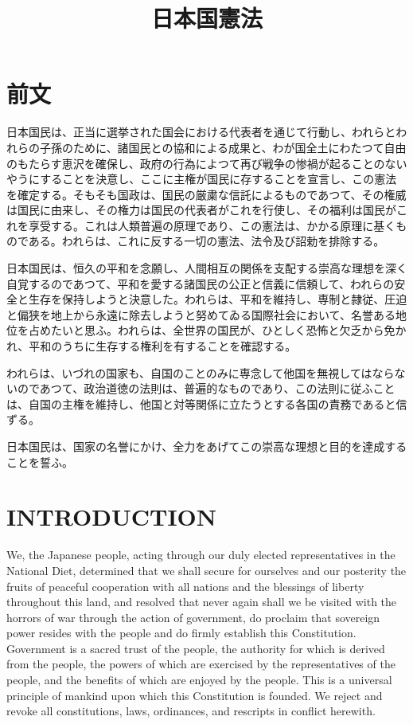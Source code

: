 \documentclass[twocolumn]{jsarticle}
\begin{document}
\title{日本国憲法}
\author{}
\date{}
\maketitle

\section*{前文}

日本国民は、正当に選挙された国会における代表者を通じて行動し、われらとわれらの子孫のために、諸国民との協和による成果と、わが国全土にわたつて自由のもたらす恵沢を確保し、政府の行為によつて再び戦争の惨禍が起ることのないやうにすることを決意し、ここに主権が国民に存することを宣言し、この憲法を確定する。そもそも国政は、国民の厳粛な信託によるものであつて、その権威は国民に由来し、その権力は国民の代表者がこれを行使し、その福利は国民がこれを享受する。これは人類普遍の原理であり、この憲法は、かかる原理に基くものである。われらは、これに反する一切の憲法、法令及び詔勅を排除する。

日本国民は、恒久の平和を念願し、人間相互の関係を支配する崇高な理想を深く自覚するのであつて、平和を愛する諸国民の公正と信義に信頼して、われらの安全と生存を保持しようと決意した。われらは、平和を維持し、専制と隷従、圧迫と偏狭を地上から永遠に除去しようと努めてゐる国際社会において、名誉ある地位を占めたいと思ふ。われらは、全世界の国民が、ひとしく恐怖と欠乏から免かれ、平和のうちに生存する権利を有することを確認する。

われらは、いづれの国家も、自国のことのみに専念して他国を無視してはならないのであつて、政治道徳の法則は、普遍的なものであり、この法則に従ふことは、自国の主権を維持し、他国と対等関係に立たうとする各国の責務であると信ずる。

日本国民は、国家の名誉にかけ、全力をあげてこの崇高な理想と目的を達成することを誓ふ。

\newpage

\section*{INTRODUCTION}

We, the Japanese people, acting through our duly elected representatives in the National Diet, determined that we shall secure for ourselves and our posterity the fruits of peaceful cooperation with all nations and the blessings of liberty throughout this land, and resolved that never again shall we be visited with the horrors of war through the action of government, do proclaim that sovereign power resides with the people and do firmly establish this Constitution. Government is a sacred trust of the people, the authority for which is derived from the people, the powers of which are exercised by the representatives of the people, and the benefits of which are enjoyed by the people. This is a universal principle of mankind upon which this Constitution is founded. We reject and revoke all constitutions, laws, ordinances, and rescripts in conflict herewith.
\end{document}
